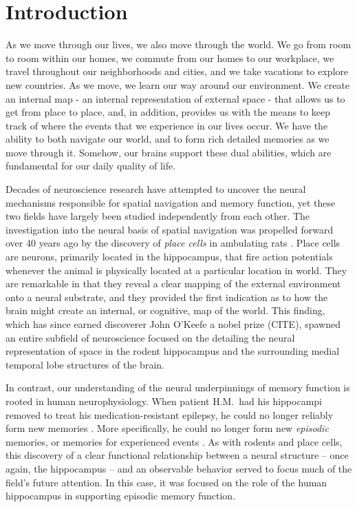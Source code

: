 \chapter{Introduction}



%
%
%

As we move through our lives, we also move through the world. We go from room to room within our homes, we commute from our homes to our workplace, we travel throughout our neighborhoods and cities, and we take vacations to explore new countries. As we move, we learn our way around our environment. We create an internal map - an internal representation of external space - that allows us to get from place to place, and, in addition, provides us with the means to keep track of where the events that we experience in our lives occur. We have the ability to both navigate our world, and to form rich detailed memories as we move through it. Somehow, our brains support these dual abilities, which are fundamental for our daily quality of life.

Decades of neuroscience research have attempted to uncover the neural mechanisms responsible for spatial navigation and memory function, yet these two fields have largely been studied independently from each other. The investigation into the neural basis of spatial navigation was propelled forward over 40 years ago by the discovery of \textit{place cells} in ambulating rats \citep{OKeeDost71}. Place cells are neurons, primarily located in the hippocampus, that fire action potentials whenever the animal is physically located at a particular location in world. They are remarkable in that they reveal a clear mapping of the external environment onto a neural substrate, and they provided the first indication as to how the brain might create an internal, or cognitive, map of the world. This finding, which has since earned discoverer John O'Keefe a nobel prize (CITE), spawned an entire subfield of neuroscience focused on the detailing the neural representation of space in the rodent hippocampus and the surrounding medial temporal lobe structures of the brain.

In contrast, our understanding of the neural underpinnings of memory function is rooted in human neurophysiology. When patient H.M.\ had his hippocampi removed to treat his medication-resistant epilepsy, he could no longer reliably form new memories \citep{ScovMiln57}. More specifically, he could no longer form new \textit{episodic} memories, or memories for experienced events \citep{Tulv72}. As with rodents and  place cells, this discovery of a clear functional relationship between a neural structure -- once again, the hippocampus -- and an observable behavior served to focus much of the field's future attention. In this case, it was focused on the role of the human hippocampus in supporting episodic memory function.

